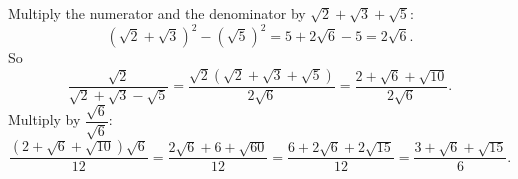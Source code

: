 Multiply the numerator and the denominator by $\sqrt2+\sqrt3+\sqrt5$:
\[\left(\sqrt2+\sqrt3\right)^2-\left(\sqrt5\right)^2=5+2\sqrt6-5=2\sqrt6.\]
So
\[\dfrac{\sqrt2}{\sqrt2+\sqrt3-\sqrt5}=\dfrac{\sqrt2\left(\sqrt2+\sqrt3+\sqrt5\right)}{2\sqrt6}=\dfrac{2+\sqrt6+\sqrt{10}}{2\sqrt6}.\]
Multiply by $\dfrac{\sqrt6}{\sqrt6}$:
\[\dfrac{\left(2+\sqrt6+\sqrt{10}\right)\sqrt6}{12}=\dfrac{2\sqrt6+6+\sqrt{60}}{12}=\dfrac{6+2\sqrt6+2\sqrt{15}}{12}=\boxed{\dfrac{3+\sqrt6+\sqrt{15}}{6}}.\]
